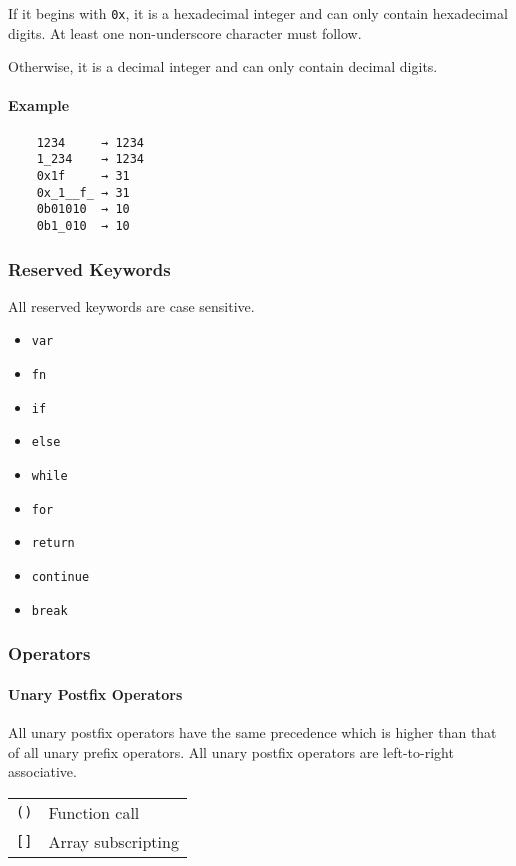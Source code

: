 If it begins with \verb|0x|, it is a hexadecimal integer and can only contain hexadecimal digits. At least one non-underscore character must follow.

Otherwise, it is a decimal integer and can only contain decimal digits.

\paragraph{Example}

\begin{verbatim}
    1234     → 1234
    1_234    → 1234
    0x1f     → 31
    0x_1__f_ → 31
    0b01010  → 10
    0b1_010  → 10
\end{verbatim}

\subsubsection{Reserved Keywords}

All reserved keywords are case sensitive.

\begin{itemize}
    \item \verb|var|
    \item \verb|fn|
    \item \verb|if|
    \item \verb|else|
    \item \verb|while|
    \item \verb|for|
    \item \verb|return|
    \item \verb|continue|
    \item \verb|break|
\end{itemize}

\subsubsection{Operators}

\paragraph{Unary Postfix Operators}

All unary postfix operators have the same precedence which is higher than that of all unary prefix operators. All unary postfix operators are left-to-right associative.

\begin{table}[H]
    \begin{tabular}{ l l }
        \verb|()| & Function call      \\
        \verb|[]| & Array subscripting \\
    \end{tabular}
\end{table}


